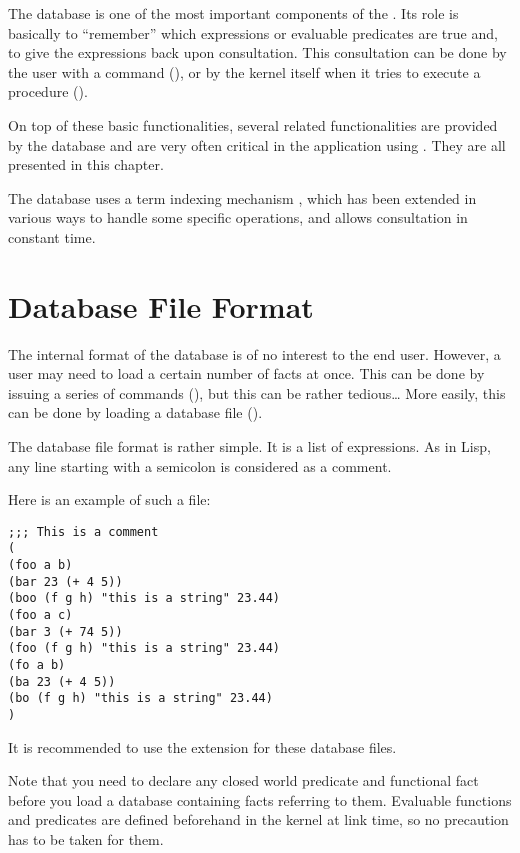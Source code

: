 The database is one of the most important components of the \CPK{}.
Its role is basically to ``remember'' which expressions or
evaluable predicates are true and, to give the expressions back upon
consultation. This consultation can be done by the user with
a  command (), or
by the kernel itself when it tries to execute a procedure
().

On top of these basic functionalities, several related
functionalities are provided by the database and are very often
critical in the application using \COPRS. They are all presented in this
chapter.

The database uses a term indexing mechanism \cite{Stieckel}, which has
been extended in various ways to handle some specific operations, and allows
consultation in constant time.



\section{Database File Format}

The internal format of the database is of no interest to the end user.
However, a user may need to load a certain number of facts at once. This can be
done by issuing a series of  commands (), but this can be rather tedious\dots{} More easily, this
can be done by loading a database file ().

The database file format is rather simple. It is a list of expressions. As in
Lisp, any line starting with a semicolon \samp{;} is considered as a comment.

Here is an example of such a file:
\begin{verbatim}
;;; This is a comment
(
(foo a b)
(bar 23 (+ 4 5))
(boo (f g h) "this is a string" 23.44)
(foo a c)
(bar 3 (+ 74 5))
(foo (f g h) "this is a string" 23.44)
(fo a b)
(ba 23 (+ 4 5))
(bo (f g h) "this is a string" 23.44)
)
\end{verbatim}

It is recommended to use the  extension for these database files.

Note that you need to declare any closed world predicate and functional
fact before you load a database containing facts referring to them.
Evaluable functions and predicates are defined beforehand in the kernel at
link time, so no precaution has to be taken for them.

